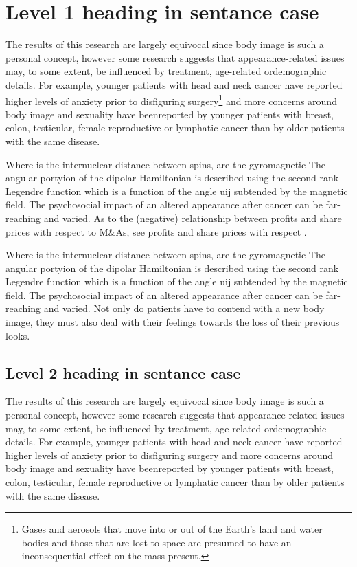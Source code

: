 \documentclass[onecolumn,authoryear]{els-mrw}
\begin{document}
\section{Level 1 heading in sentance case}\label{chap1:sec1}

The results of this research are largely equivocal since body image is such a personal
concept, however some research suggests that appearance-related issues may, to some
extent, be influenced by treatment, age-related ordemographic details. For example,
younger patients with head and neck cancer have reported higher levels of anxiety
prior to disfiguring surgery\footnote{Gases and aerosols that move into or out of the
Earth's land and water bodies and those that are lost to space are
presumed to have an inconsequential effect on the mass present.} and more concerns around body image and sexuality have
beenreported by younger patients with breast, colon, testicular, female reproductive or
lymphatic cancer than by older patients with the same disease.

Where is the internuclear distance between spins, are the gyromagnetic
The angular portyion of the dipolar Hamiltonian is described using the second rank
Legendre function which is a function of the angle uij subtended by the magnetic field.
The psychosocial impact of an altered appearance after cancer can be far-reaching and
varied. As to the (negative) relationship between profits and share prices with respect to M\&As, see profits and
share prices with respect \cite{bib1}.

Where is the internuclear distance between spins, are the gyromagnetic
The angular portyion of the dipolar Hamiltonian is described using the second rank
Legendre function which is a function of the angle uij subtended by the magnetic field.
The psychosocial impact of an altered appearance after cancer can be far-reaching and
varied. Not only do patients have to contend with a new body image, \cite{bib2} they must also
deal with their feelings towards the loss of their previous looks.

\subsection{Level 2 heading in sentance case}\label{chap1:subsec1}

The results of this research are largely equivocal since body image is such a personal
concept, however some research suggests that appearance-related issues may, to some
extent, be influenced by treatment, age-related ordemographic details. For example,
younger patients with head and neck cancer have reported higher levels of anxiety
prior to disfiguring surgery and more concerns around body image and sexuality have
beenreported by younger patients with breast, colon, testicular, female reproductive or
lymphatic cancer than by older patients with the same disease.
\end{document}
